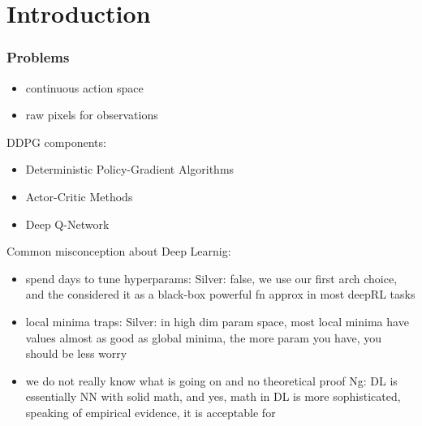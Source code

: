 \section{Introduction}

\begin{frame}
\frametitle{Problems}
\begin{itemize}
  \item continuous action space
  \item raw pixels for observations
\end{itemize}

DDPG components:
\begin{itemize}
  \item Deterministic Policy-Gradient Algorithms \cite{Silver2014}
  \item Actor-Critic Methods \cite{Sutton1998}
  \item Deep Q-Network \cite{Mnih2013}
\end{itemize}

Common misconception about Deep Learnig:
\begin{itemize}
  \item spend days to tune hyperparams:
  Silver: false, we use our first arch choice, and
  the considered it as a black-box powerful fn approx in most deepRL tasks
  \item local minima traps:
  Silver: in high dim param space, most local minima have values almost as good as global minima,
  the more param you have, you should be less worry
  \item we do not really know what is going on and no theoretical proof
  Ng: DL is essentially NN with solid math, and yes, math in DL is more sophisticated,
  speaking of empirical evidence, it is acceptable for
\end{itemize}

\end{frame}
